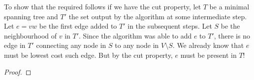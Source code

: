 To show that the required follows if we have the cut property, let $T$ be a minimal spanning tree and $T'$ the set output by the algorithm at some intermediate step. Let $e=vw$ be the first edge added to $T'$ in the subsequent steps. Let $S$ be the neighbourhood of $v$ in $T'$. Since the algorithm was able to add $e$ to $T'$, there is no edge in $T'$ connecting any node in $S$ to any node in $V\setminus S$. We already know that $e$ must be lowest cost such edge. But by the cut property, $e$ must be present in $T$!
\begin{proof}
	
\end{proof}
